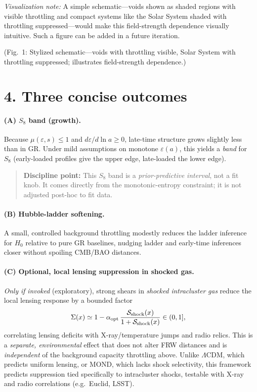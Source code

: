 \documentclass[aps,prd,onecolumn,superscriptaddress,nofootinbib]{revtex4-2}
\newcommand{\eps}{\varepsilon}
\newcommand{\Sig}{\Sigma}
\begin{document}
\medskip
\noindent\emph{Visualization note:} A simple schematic---voids shown as shaded regions with visible throttling and compact systems like the Solar System shaded with throttling suppressed---would make this field-strength dependence visually intuitive. Such a figure can be added in a future iteration.

\medskip
\noindent (Fig.~1: Stylized schematic---voids with throttling visible, Solar System with throttling suppressed; illustrates field-strength dependence.)

\section*{4. Three concise outcomes}
\paragraph*{(A) $S_8$ band (growth).}
Because $\mu(\eps,s)\!\le\!1$ and $d\eps/d\ln a\!\ge\!0$, late-time structure grows slightly less than in GR. Under mild assumptions on monotone $\eps(a)$, this yields a \emph{band} for $S_8$ (early-loaded profiles give the upper edge, late-loaded the lower edge). 
\begin{quote}
\textbf{Discipline point:} This $S_8$ band is a \emph{prior-predictive interval}, not a fit knob. It comes directly from the monotonic-entropy constraint; it is not adjusted post-hoc to fit data.
\end{quote}

\paragraph*{(B) Hubble-ladder softening.}
A small, controlled background throttling modestly reduces the ladder inference for $H_0$ relative to pure GR baselines, nudging ladder and early-time inferences closer without spoiling CMB/BAO distances.

\paragraph*{(C) Optional, local lensing suppression in shocked gas.}
\emph{Only if invoked} (exploratory), strong shears in \emph{shocked intracluster gas} reduce the local lensing response by a bounded factor
\[
\Sig(x)\simeq 1-\alpha_{\rm opt}\,\frac{\mathcal{S}_{\rm shock}(x)}{1+\mathcal{S}_{\rm shock}(x)} \in (0,1],
\]
correlating lensing deficits with X-ray/temperature jumps and radio relics. This is a \emph{separate, environmental} effect that does not alter FRW distances and is \emph{independent} of the background capacity throttling above.
Unlike $\Lambda$CDM, which predicts uniform lensing, or MOND, which lacks shock selectivity, this framework predicts suppression tied specifically to intracluster shocks, testable with X-ray and radio correlations (e.g.\ Euclid, LSST).
\end{document}
